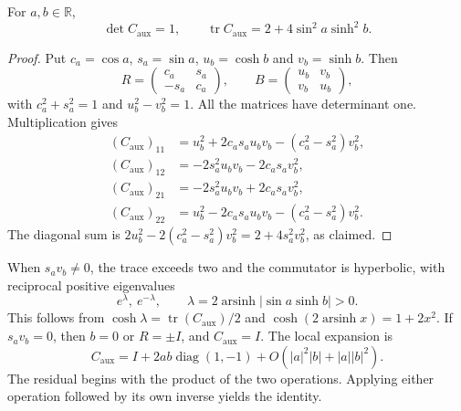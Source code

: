 \begin{proposition}
\label{md:aux:prop-traza}
For $a,b\in\mathbb R$,
\begin{equation}
 \det C_{\mathrm{aux}}=1,\qquad
 \operatorname{tr}C_{\mathrm{aux}}=2+4\sin^2a\sinh^2b.
 \label{md:aux:traza-compensado}
\end{equation}
\end{proposition}
\begin{proof}
Put $c_a=\cos a$, $s_a=\sin a$, $u_b=\cosh b$ and $v_b=\sinh b$.
Then
\[
 R=\begin{pmatrix}c_a&s_a\\-s_a&c_a\end{pmatrix},\qquad
 B=\begin{pmatrix}u_b&v_b\\v_b&u_b\end{pmatrix},
\]
with $c_a^2+s_a^2=1$ and $u_b^2-v_b^2=1$. All the matrices have
determinant one. Multiplication gives
\begin{equation}
 \begin{aligned}
 (C_{\mathrm{aux}})_{11}&=u_b^2+2c_as_au_bv_b-(c_a^2-s_a^2)v_b^2,\\
 (C_{\mathrm{aux}})_{12}&=-2s_a^2u_bv_b-2c_as_av_b^2,\\
 (C_{\mathrm{aux}})_{21}&=-2s_a^2u_bv_b+2c_as_av_b^2,\\
 (C_{\mathrm{aux}})_{22}&=u_b^2-2c_as_au_bv_b-(c_a^2-s_a^2)v_b^2.
 \end{aligned}
 \label{md:aux:entradas-compensado}
\end{equation}
The diagonal sum is
$2u_b^2-2(c_a^2-s_a^2)v_b^2=2+4s_a^2v_b^2$, as claimed.
\end{proof}

When $s_av_b\ne0$, the trace exceeds two and the commutator is
hyperbolic, with reciprocal positive eigenvalues
\begin{equation}
 e^{\lambda},\ e^{-\lambda},\qquad
 \lambda=2\operatorname{arsinh}|\sin a\sinh b|>0.
 \label{md:aux:espectro-compensado}
\end{equation}
This follows from $\cosh\lambda=\operatorname{tr}(C_{\mathrm{aux}})/2$
and $\cosh(2\operatorname{arsinh}x)=1+2x^2$.
If $s_av_b=0$, then $b=0$ or $R=\pm I$, and
$C_{\mathrm{aux}}=I$.
The local expansion is
\begin{equation}
 C_{\mathrm{aux}}=I+2ab\operatorname{diag}(1,-1)
 +O(|a|^2|b|+|a||b|^2).
 \label{md:aux:expansion-compensado}
\end{equation}
The residual begins with the product of the two operations. Applying
either operation followed by its own inverse yields the identity.


